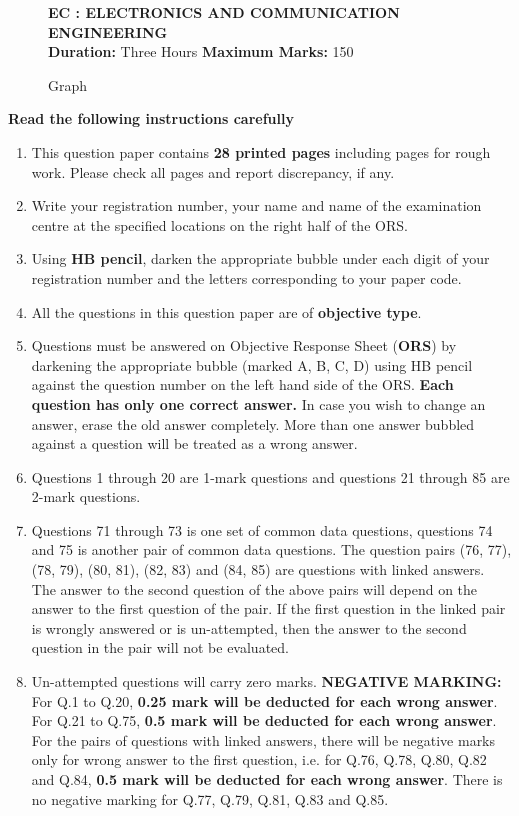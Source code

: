 \documentclass[12pt]{article}
\begin{document}
\begin{figure}[H]\centering
    {\LARGE \textbf{EC : ELECTRONICS AND COMMUNICATION ENGINEERING}}\\[0.7em]
    \textbf{Duration:} Three Hours
    \hspace{2cm}
    \textbf{Maximum Marks:} 150
\caption{Graph}
\label{fig:q11}
\end{figure}


\textbf{Read the following instructions carefully}
\begin{enumerate}[leftmargin=2em,itemsep=0.5em]
    \item This question paper contains \textbf{28 printed pages} including pages for rough work. Please check all pages and report discrepancy, if any.
    \item Write your registration number, your name and name of the examination centre at the specified locations on the right half of the ORS.
    \item Using \textbf{HB pencil}, darken the appropriate bubble under each digit of your registration number and the letters corresponding to your paper code.
    \item All the questions in this question paper are of \textbf{objective type}.
    \item Questions must be answered on Objective Response Sheet (\textbf{ORS}) by darkening the appropriate bubble (marked A, B, C, D) using HB pencil against the question number on the left hand side of the ORS. \textbf{Each question has only one correct answer.} In case you wish to change an answer, erase the old answer completely. More than one answer bubbled against a question will be treated as a wrong answer.
    \item Questions 1 through 20 are 1-mark questions and questions 21 through 85 are 2-mark questions.
    \item Questions 71 through 73 is one set of common data questions, questions 74 and 75 is another pair of common data questions. The question pairs (76, 77), (78, 79), (80, 81), (82, 83) and (84, 85) are questions with linked answers. The answer to the second question of the above pairs will depend on the answer to the first question of the pair. If the first question in the linked pair is wrongly answered or is un-attempted, then the answer to the second question in the pair will not be evaluated.
    \item Un-attempted questions will carry zero marks.
     \large \textbf {NEGATIVE MARKING:} For Q.1 to Q.20, \textbf{0.25 mark will be deducted for each wrong answer}. For Q.21 to Q.75, \textbf{0.5 mark will be deducted for each wrong answer}. For the pairs of questions with linked answers, there will be negative marks only for wrong answer to the first question, i.e. for Q.76, Q.78, Q.80, Q.82 and Q.84, \textbf{0.5 mark will be deducted for each wrong answer}. There is no negative marking for Q.77, Q.79, Q.81, Q.83 and Q.85.

\end{enumerate}
\end{document}
